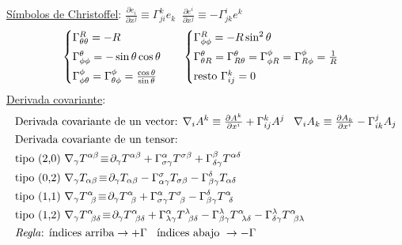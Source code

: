 \underline{Símbolos de Christoffel}:    $\frac{\partial e_i}{\partial x^j}{\equiv}\Gamma_{ji}^{k}e_k\; \; \frac{\partial e^i}{\partial x^j}{\equiv}{-} \Gamma^i_{jk} e^k$\; 
\begin{align*}
&\begin{cases} 
\Gamma_{\theta \theta}^R = - R \vspace{3pt} \\
\Gamma_{\phi \phi}^\theta = - \sin \theta \cos \theta \vspace{3pt} \\ 
\Gamma_{\phi \theta}^\phi = \Gamma_{\theta \phi}^\phi = \frac{\cos \theta }{\sin \theta}
\end{cases}
&
\begin{cases} 
\Gamma^R_{\phi \phi }=- R \sin^2 \theta \vspace{3pt} \\ 
\Gamma_{\theta R}^\theta = \Gamma^\theta_{R \theta} = \Gamma_{\phi R}^\phi =\Gamma_{R\phi}^\phi =\frac{1}{R}\vspace{3pt}\\ 
\text{resto } \Gamma_{ij}^k = 0
\end{cases}    
\end{align*}
\underline{Derivada covariante}: 
\vspace{-3pt}
\begin{align*}
    &\text{Derivada covariante de un vector: } \nabla_iA^k \equiv \tfrac{\partial A^k }{\partial x^i}+\Gamma^k_{ij}A^j\; \; \; \nabla_iA_k\equiv \tfrac{\partial A_k}{\partial x^i}-\Gamma^j_{ik}A_j\\
    &\text{Derivada covariante de un tensor:}\\
    &\text{tipo (2,0) }\nabla_\gamma T^{\alpha \beta} \!\equiv\!\partial_\gamma T^{\alpha\beta} + \Gamma_{\sigma\gamma}^\alpha T^{\sigma\beta}+\Gamma ^\beta_{\delta \gamma}T^{\alpha\delta}\\
    &\text{tipo (0,2) }\nabla_\gamma T_{\alpha \beta} \!\equiv\!\partial_\gamma T_{\alpha\beta} -\Gamma_{\alpha\gamma}^\sigma T_{\sigma\beta}-\Gamma^\delta_{\beta \gamma}T_{\alpha\delta}\\
&\text{tipo (1,1) }\nabla_\gamma T^{\alpha}_{\;\;\beta} \!\equiv\!\partial_\gamma T^{\alpha}_{\;\;\beta} + \Gamma_{\sigma\gamma}^\alpha T^{\sigma}_{\;\;\beta}-\Gamma ^\delta_{ \beta\gamma}T^{\alpha}_{\;\;\delta}\\
&\text{tipo (1,2) }\nabla_\gamma T_{\;\; \beta \delta}^\alpha \!\equiv\!\partial_\gamma T_{\;\; \beta\delta}^\alpha +
\Gamma_{\lambda\gamma}^\alpha T_{\;\;\beta\delta}^\lambda-\Gamma^{\lambda}_{\beta\gamma}T_{\;\;\lambda\delta}^\alpha-\Gamma_{\delta\gamma}^\lambda T^{\alpha}_{\;\;\beta\lambda}\\
&\text{\textit{Regla}: índices arriba} \rightarrow + \Gamma\;\;\text{ índices abajo } \rightarrow -\Gamma
\end{align*}
